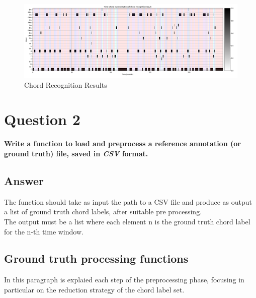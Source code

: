 \documentclass[
	12pt, %
]{fphw}
\begin{document}
\begin{figure}[H]
 \centering
 \includegraphics[scale=1]{./images/1_recognition_results.png}
 \caption{Chord Recognition Results}
\end{figure}


\section*{\color{red}Question 2}

\begin{problem}
	\textbf{Write a function to load and preprocess a reference annotation (or ground truth) file, saved in \emph{CSV} format.}
\end{problem}

\subsection*{\color{blue}Answer}

The function should take as input the path to a CSV file and produce as output a list of ground truth chord labels, after suitable pre processing.\\
The output must be a list where each element n is the ground truth chord label for the n-th time window.

\subsection*{Ground truth processing functions}

In this paragraph is explaied each step of the preprocessing phase, focusing in particular on the reduction strategy of the chord label set.
\end{document}
